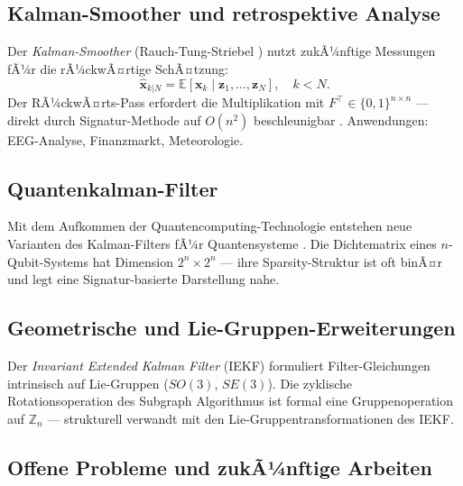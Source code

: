 ﻿\documentclass[a4paper,12pt]{article}
\theoremstyle{definition}
\begin{document}
\subsection{Kalman-Smoother und retrospektive Analyse}

Der \emph{Kalman-Smoother} (Rauch-Tung-Striebel \cite{rauch1965}) nutzt zukÃ¼nftige
Messungen fÃ¼r die rÃ¼ckwÃ¤rtige SchÃ¤tzung:
\[
    \hat{\mathbf{x}}_{k|N} = \mathbb{E}[\mathbf{x}_k \mid \mathbf{z}_1, \ldots, \mathbf{z}_N],
    \quad k < N.
\]
Der RÃ¼ckwÃ¤rts-Pass erfordert die Multiplikation mit $F^\top \in \{0,1\}^{n\times n}$
--- direkt durch Signatur-Methode auf $O(n^2)$ beschleunigbar \cite{epp2026boolmm}.
Anwendungen: EEG-Analyse, Finanzmarkt, Meteorologie.

\subsection{Quantenkalman-Filter}

Mit dem Aufkommen der Quantencomputing-Technologie entstehen neue Varianten des
Kalman-Filters fÃ¼r Quantensysteme \cite{belavkin1992}. Die Dichtematrix eines
$n$-Qubit-Systems hat Dimension $2^n \times 2^n$ --- ihre Sparsity-Struktur ist oft
binÃ¤r und legt eine Signatur-basierte Darstellung nahe.

\subsection{Geometrische und Lie-Gruppen-Erweiterungen}

Der \emph{Invariant Extended Kalman Filter} (IEKF) \cite{barrau2015} formuliert
Filter-Gleichungen intrinsisch auf Lie-Gruppen ($SO(3)$, $SE(3)$). Die zyklische
Rotationsoperation des Subgraph Algorithmus \cite{epp2026} ist formal eine
Gruppenoperation auf $\mathbb{Z}_n$ --- strukturell verwandt mit den
Lie-Gruppentransformationen des IEKF.

\subsection{Offene Probleme und zukÃ¼nftige Arbeiten}
\end{document}

